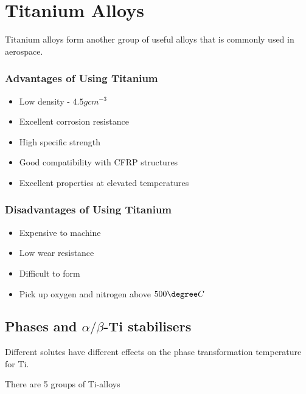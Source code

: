 \section{Titanium Alloys} %
\label{sec:titanium_alloys}

Titanium alloys form another group of useful alloys that is commonly used in aerospace.

\subsubsection{Advantages of Using Titanium} %
\label{ssub:advantages_of_using_titanium}

\begin{itemize}
  \item Low density - $4.5 g cm^{-3}$
  \item Excellent corrosion resistance
  \item High specific strength
  \item Good compatibility with CFRP structures
  \item Excellent properties at elevated temperatures
\end{itemize}

\subsubsection{Disadvantages of Using Titanium} %
\label{ssub:disadvantages_of_using_titanium}

\begin{itemize}
  \item Expensive to machine
  \item Low wear resistance
  \item Difficult to form
  \item Pick up oxygen and nitrogen above $500\degree C$
\end{itemize}

\subsection{Phases and $\alpha/\beta$-Ti stabilisers} %
\label{sub:phases_and_}

Different solutes have different effects on the phase transformation temperature for Ti.

There are 5 groups of Ti-alloys

